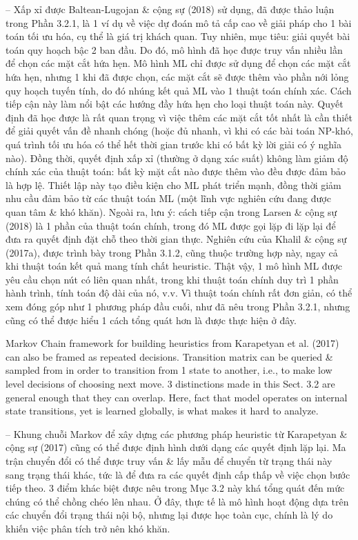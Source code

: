 \documentclass{article}
\begin{document}
\begin{itemize}
\begin{itemize}
\begin{itemize}
            -- Xấp xỉ được Baltean-Lugojan \& cộng sự (2018) sử dụng, đã được thảo luận trong Phần 3.2.1, là 1 ví dụ về việc dự đoán mô tả cấp cao về giải pháp cho 1 bài toán tối ưu hóa, cụ thể là giá trị khách quan. Tuy nhiên, mục tiêu: giải quyết bài toán quy hoạch bậc 2 ban đầu. Do đó, mô hình đã học được truy vấn nhiều lần để chọn các mặt cắt hứa hẹn. Mô hình ML chỉ được sử dụng để chọn các mặt cắt hứa hẹn, nhưng 1 khi đã được chọn, các mặt cắt sẽ được thêm vào phần nới lỏng quy hoạch tuyến tính, do đó nhúng kết quả ML vào 1 thuật toán chính xác. Cách tiếp cận này làm nổi bật các hướng đầy hứa hẹn cho loại thuật toán này. Quyết định đã học được là rất quan trọng vì việc thêm các mặt cắt tốt nhất là cần thiết để giải quyết vấn đề nhanh chóng (hoặc đủ nhanh, vì khi có các bài toán NP-khó, quá trình tối ưu hóa có thể hết thời gian trước khi có bất kỳ lời giải có ý nghĩa nào). Đồng thời, quyết định xấp xỉ (thường ở dạng xác suất) không làm giảm độ chính xác của thuật toán: bất kỳ mặt cắt nào được thêm vào đều được đảm bảo là hợp lệ. Thiết lập này tạo điều kiện cho ML phát triển mạnh, đồng thời giảm nhu cầu đảm bảo từ các thuật toán ML (một lĩnh vực nghiên cứu đang được quan tâm \& khó khăn). Ngoài ra, lưu ý: cách tiếp cận trong Larsen \& cộng sự (2018) là 1 phần của thuật toán chính, trong đó ML được gọi lặp đi lặp lại để đưa ra quyết định đặt chỗ theo thời gian thực. Nghiên cứu của Khalil \& cộng sự (2017a), được trình bày trong Phần 3.1.2, cũng thuộc trường hợp này, ngay cả khi thuật toán kết quả mang tính chất heuristic. Thật vậy, 1 mô hình ML được yêu cầu chọn nút có liên quan nhất, trong khi thuật toán chính duy trì 1 phần hành trình, tính toán độ dài của nó, v.v. Vì thuật toán chính rất đơn giản, có thể xem đóng góp như 1 phương pháp đầu cuối, như đã nêu trong Phần 3.2.1, nhưng cũng có thể được hiểu 1 cách tổng quát hơn là được thực hiện ở đây.

            Markov Chain framework for building heuristics from Karapetyan et al. (2017) can also be framed as repeated decisions. Transition matrix can be queried \& sampled from in order to transition from 1 state to another, i.e., to make low level decisions of choosing next move. 3 distinctions made in this Sect. 3.2 are general enough that they can overlap. Here, fact that model operates on internal state transitions, yet is learned globally, is what makes it hard to analyze.

            -- Khung chuỗi Markov để xây dựng các phương pháp heuristic từ Karapetyan \& cộng sự (2017) cũng có thể được định hình dưới dạng các quyết định lặp lại. Ma trận chuyển đổi có thể được truy vấn \& lấy mẫu để chuyển từ trạng thái này sang trạng thái khác, tức là để đưa ra các quyết định cấp thấp về việc chọn bước tiếp theo. 3 điểm khác biệt được nêu trong Mục 3.2 này khá tổng quát đến mức chúng có thể chồng chéo lên nhau. Ở đây, thực tế là mô hình hoạt động dựa trên các chuyển đổi trạng thái nội bộ, nhưng lại được học toàn cục, chính là lý do khiến việc phân tích trở nên khó khăn.


\end{itemize}
\end{itemize}
\end{itemize}
\end{document}
